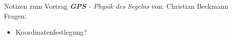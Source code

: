 
\newcommand{\ch}{$\checkmark$}

    {\huge Notizen zum Vortrag \textit{\textbf{GPS} - Physik des Segelns}}
    von: Christian Beckmann
    \tableofcontents
    Fragen:
    \begin{itemize}
        \item Koordinatenfestlegung?
    \end{itemize}
    \newpage
    
    
    
    
    
    
    

